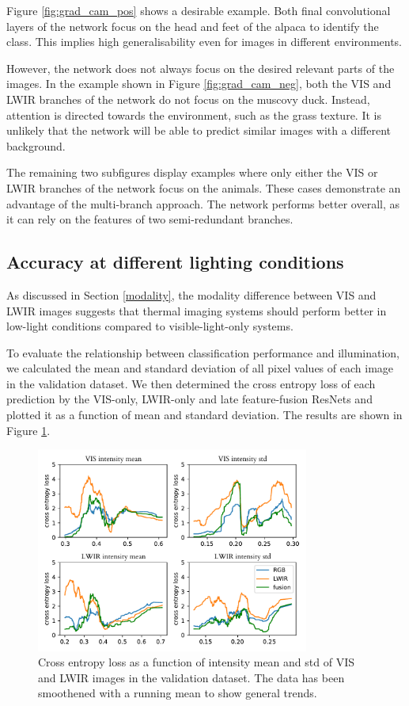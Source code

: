 \documentclass{l4proj}
\begin{document}
Figure \ref{fig:grad_cam_pos} shows a desirable example. Both final convolutional layers of the network focus on the head and feet of the alpaca to identify the class. This implies high generalisability even for images in different environments.

However, the network does not always focus on the desired relevant parts of the images. In the example shown in Figure \ref{fig:grad_cam_neg}, both the VIS and LWIR branches of the network do not focus on the muscovy duck. Instead, attention is directed towards the environment, such as the grass texture. It is unlikely that the network will be able to predict similar images with a different background.

The remaining two subfigures display examples where only either the VIS or LWIR branches of the network focus on the animals. These cases demonstrate an advantage of the multi-branch approach. The network performs better overall, as it can rely on the features of two semi-redundant branches.


\subsection{Accuracy at different lighting conditions}

As discussed in Section \ref{modality}, the modality difference between VIS and LWIR images suggests that thermal imaging systems should perform better in low-light conditions compared to visible-light-only systems.

To evaluate the relationship between classification performance and illumination, we calculated the mean and standard deviation of all pixel values of each image in the validation dataset. We then determined the cross entropy loss of each prediction by the VIS-only, LWIR-only and late feature-fusion ResNets and plotted it as a function of mean and standard deviation. The results are shown in Figure \ref{fig:illumination}.

\begin{figure}[ht]
  \centering
  \includegraphics[width=0.8\textwidth]{images/evaluation/illumination}
  \caption{Cross entropy loss as a function of intensity mean and std of VIS and LWIR images in the validation dataset. The data has been smoothened with a running mean to show general trends.}
  \label{fig:illumination}
\end{figure}
\end{document}
